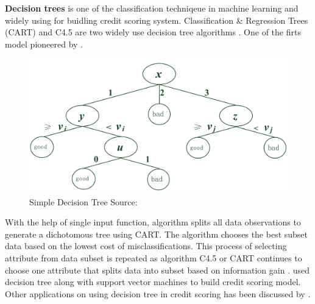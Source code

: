 {\textbf{Decision trees} is one of the classification techniqeue in machine learning and widely using for buidling credit scoring system. Classification \& Regression Trees (CART) and C4.5 are two widely use decision tree algorithms \citep{kohavi2002data}. One of the firts model pioneered by \cite{breiman1984classification}.
\begin{figure}
\includegraphics[width=\textwidth]{simpledt.png}
\caption{Simple Decision Tree 
Source: \citep{zhang2010vertical}}
\end{figure}
With the help of single input function, algorithm splits all data observations to generate a dichotomous tree using CART.  The algorithm chooses the best subset data based on the lowest cost of misclassifications\citep{zekic2004small}. This process of selecting attribute from data subset is repeated as algorithm C4.5 or CART continues to choose one attribute that splits data into subset based on information gain \citep{zhou2008new}. \citet{huang2007credit} used decision tree along with support vector machines to build credit scoring model. Other applications on using decision tree in credit scoring has been discussed by \citep{xia2017boosted,koh2015two,koutanaei2015hybrid}.\\


}
